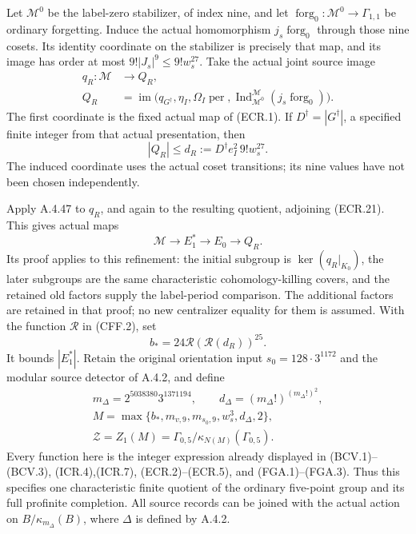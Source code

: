 Let $\mathcal M^0$ be the label-zero stabilizer, of index nine,
and let $\operatorname{forg}_0:\mathcal M^0\to\Gamma_{1,1}$
be ordinary forgetting.  Induce the actual homomorphism
$j_s\operatorname{forg}_0$ through those nine cosets.
Its identity coordinate on the stabilizer is precisely that
map, and its image has order at most
$9!|J_s|^9\leq9!w_s^{27}$.
Take the actual joint source image
\[
 \begin{split}
 q_R:\mathcal M&\longrightarrow Q_R,\\
 Q_R&=\operatorname{im}\bigl(q_{G^\dagger},\eta_I,
       \Omega_I\operatorname{per},
       \operatorname{Ind}_{\mathcal M^0}^{\mathcal M}
                    (j_s\operatorname{forg}_0)\bigr).
 \end{split}                                                     \tag{FCP.5}
\]
The first coordinate is the fixed actual map of (ECR.1).
If $D^\dagger=|G^\dagger|$, a specified finite integer from
that actual presentation, then
\[
                    |Q_R|\leq d_R
                      :=D^\dagger e_I^2\,9!w_s^{27}.
                                                               \tag{FCP.6}
\]
The induced coordinate uses the actual coset transitions;
its nine values have not been chosen independently.

Apply A.4.47 to $q_R$, and again to the resulting quotient,
adjoining (ECR.21).  This gives actual maps
\[
 \mathcal M\longrightarrow E_1^*\longrightarrow E_0
                            \longrightarrow Q_R.
                                                               \tag{FCP.7}
\]
Its proof applies to this refinement: the initial subgroup
is $\ker(q_R|_{K_0})$, the later subgroups are the same
characteristic cohomology-killing covers, and the retained
old factors supply the label-period comparison.
The additional factors are retained in that proof; no new
centralizer equality for them is assumed.
With the function $\mathcal R$ in (CFF.2), set
\[
                    b_*=24\mathcal R(\mathcal R(d_R))^{25}.
                                                               \tag{FCP.8}
\]
It bounds $|E_1^*|$.
Retain the original orientation input $s_0=128\cdot3^{1172}$
and the modular source detector of A.4.2, and define
\[
 \begin{gathered}
 m_\Delta=2^{5038380}3^{1371194},\qquad
 d_\Delta=(m_\Delta!)^{(m_\Delta!)^2},\\
 M=\max\{b_*,m_{v,9},m_{s_0,9},w_s^3,d_\Delta,2\},\\
 \mathcal Z=Z_1(M)
             =\Gamma_{0,5}/\kappa_{N(M)}(\Gamma_{0,5}).
 \end{gathered}                                                   \tag{FCP.9}
\]
Every function here is the integer expression already
displayed in (BCV.1)--(BCV.3), (ICR.4),(ICR.7),
(ECR.2)--(ECR.5), and (FGA.1)--(FGA.3).
Thus this specifies one characteristic finite quotient of
the ordinary five-point group and its full profinite
completion.  All source records can be joined with the
actual action on $B/\kappa_{m_\Delta}(B)$, where $\Delta$
is defined by A.4.2.


